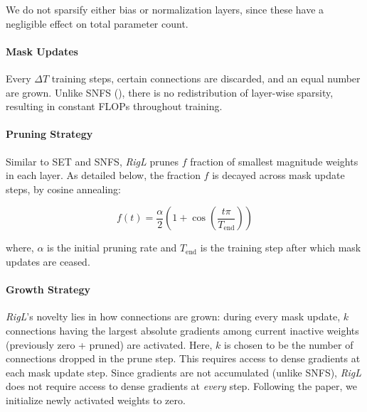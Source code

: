 We do not sparsify either bias or normalization layers, since these have a negligible effect on total parameter count.

\paragraph{Mask Updates} Every $\Delta T$ training steps, certain connections are discarded, and an equal number are grown. Unlike SNFS (\citet{dettmers2020sparse}), there is no redistribution of layer-wise sparsity, resulting in constant FLOPs throughout training.

\paragraph{Pruning Strategy} Similar to SET and SNFS, \textit{RigL} prunes $f$ fraction of smallest magnitude weights in each layer.  As detailed below, the fraction $f$ is decayed across mask update steps, by cosine annealing:

\begin{equation}
        f(t) = \frac{\alpha}{2} \left(1 + \cos \left(\frac{t\pi}{T_\text{end}} \right) \right)
\end{equation}

where, $\alpha$ is the initial pruning rate and $T_\text{end}$ is the training step after which mask updates are ceased.

\paragraph{Growth Strategy} \textit{RigL}'s novelty lies in how connections are grown: during every mask update, $k$ connections having the largest absolute gradients among current inactive weights (previously zero + pruned) are activated. Here, $k$ is chosen to be the number of connections dropped in the prune step. This requires access to dense gradients at each mask update step. Since gradients are not accumulated (unlike SNFS), \textit{RigL} does not require access to dense gradients at \textit{every} step. Following the paper, we initialize newly activated weights to zero.

